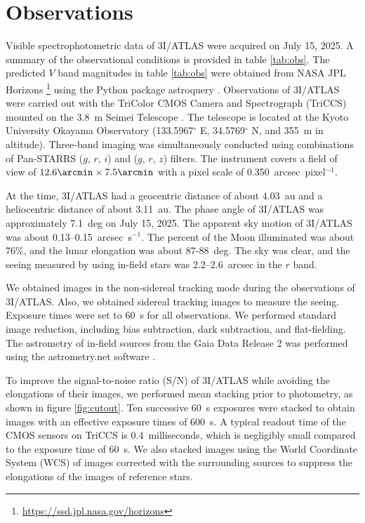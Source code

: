 \documentclass[]{pasj02}
\newcommand\I{3I/ATLAS\xspace}
\begin{document}
\section{Observations}\label{sec:obs}
Visible spectrophotometric data of \I were acquired on July 15, 2025.
A summary of the observational conditions is provided in table \ref{tab:obs}.
The predicted $V$ band magnitudes in table \ref{tab:obs} were obtained from NASA JPL Horizons \footnote{\url{https://ssd.jpl.nasa.gov/horizons}} using the Python package astroquery \citep{Ginsburg2019}.
Observations of \I were carried out with the TriColor CMOS Camera and Spectrograph (TriCCS) mounted on the 3.8~m Seimei Telescope \citep{Kurita2020}.
The telescope is located at the Kyoto University Okayama Observatory (133.5967$^\circ$ E, 34.5769$^\circ$ N, and 355~m in altitude).
Three-band imaging was simultaneously conducted using combinations of Pan-STARRS ($g$, $r$, $i$) and ($g$, $r$, $z$) filters.
The instrument covers a field of view of $12.6\arcmin \times 7.5\arcmin$ with a pixel scale of 0.350~arcsec~pixel$^{-1}$.

At the time, \I had a geocentric distance of about 4.03~au and a heliocentric distance of about 3.11~au.
The phase angle of \I was approximately 7.1~deg on July 15, 2025.
The apparent sky motion of \I was about 0.13--0.15~arcsec~s$^{-1}$.
The percent of the Moon illuminated was about 76\%, and the lunar elongation was about 87-88~deg.
The sky was clear, and the seeing measured by using in-field stars was 2.2--2.6~arcsec in the $r$ band.

We obtained images in the non-sidereal tracking mode during the observations of \I.
Also, we obtained sidereal tracking images to measure the seeing.
Exposure times were set to 60~s for all observations.
We performed standard image reduction, including bias subtraction, dark subtraction, and flat-fielding.
The astrometry of in-field sources from the Gaia Data Release 2 was performed using the astrometry.net software \citep{Lang2010}.

To improve the signal-to-noise ratio (S/N) of \I while avoiding the elongations of their images, we performed mean stacking prior to photometry, as shown in figure \ref{fig:cutout}.
Ten successive 60~s exposures were stacked to obtain images with an effective exposure times of 600~s.
A typical readout time of the CMOS sensors on TriCCS is 0.4~milliseconds,
which is negligibly small compared to the exposure time of 60~s.
We also stacked images using the World Coordinate System (WCS) of images corrected with the surrounding sources to suppress the elongations of the images of reference stars.
\end{document}
